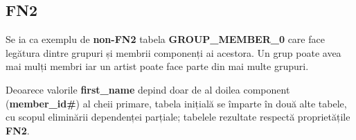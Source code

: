 \documentclass[a4paper, oneside, 12pt]{article}
\newcommand{\rowstyle}[1]{\gdef\currentrowstyle{#1}%
  #1\ignorespaces
}
\begin{document}
\begin{table}[H]
\centering
\caption*{Tabela \textbf{ALBUMS\_2}:}
\end{table}

\subsection{FN2}

Se ia ca exemplu de \textbf{non-FN2} tabela \textbf{GROUP\_MEMBER\_0} care face
legătura dintre grupuri și membrii componenți ai acestora. Un grup poate avea
mai mulți membri iar un artist poate face parte din mai multe grupuri.


\begin{table}[H]
\centering
\caption*{Tabela \textbf{GROUP\_MEMBER\_0}:}
\end{table}

Deoarece valorile \textbf{first\_name} depind doar de al doilea component
(\textbf{member\_id\#}) al cheii primare, tabela inițială se împarte în două alte tabele,
cu scopul eliminării dependenței parțiale; tabelele rezultate respectă proprietățile \textbf{FN2}.

\begin{table}[H]
\centering
\caption*{Tabela \textbf{GROUP\_MEMBER\_1}:}
\end{table}
\end{document}
